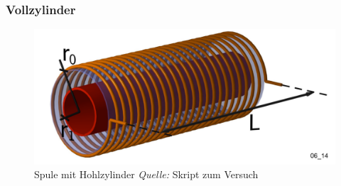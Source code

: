 \subsubsection{Vollzylinder}

\begin{figure}[th!]
    \centering
    \includegraphics[width=.5\textwidth]{images/spule-hohlzylinder.png}
    \caption{Spule mit Hohlzylinder \emph{Quelle:} Skript zum Versuch}
\end{figure}
